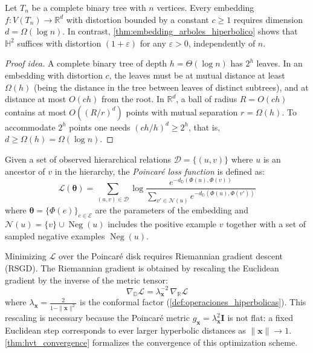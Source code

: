 \begin{proposition}\label{prop:cota_inferior_euclidiano}
Let $T_n$ be a complete binary tree with $n$ vertices. Every embedding $f: V(T_n) \to \mathbb{R}^d$ with distortion bounded by a constant $c \geq 1$ requires dimension $d = \Omega(\log n)$. In contrast, \autoref{thm:embedding_arboles_hiperbolico} shows that $\mathbb{H}^2$ suffices with distortion $(1+\varepsilon)$ for any $\varepsilon > 0$, independently of $n$.
\end{proposition}

\begin{proof}[Proof idea]
A complete binary tree of depth $h = \Theta(\log n)$ has $2^h$ leaves. In an embedding with distortion $c$, the leaves must be at mutual distance at least $\Omega(h)$ (being the distance in the tree between leaves of distinct subtrees), and at distance at most $O(ch)$ from the root. In $\mathbb{R}^d$, a ball of radius $R = O(ch)$ contains at most $O((R/r)^d)$ points with mutual separation $r = \Omega(h)$. To accommodate $2^h$ points one needs $(ch/h)^d \geq 2^h$, that is, $d \geq \Omega(h) = \Omega(\log n)$.
\end{proof}

\begin{definition}\label{def:perdida_poincare}
Given a set of observed hierarchical relations $\mathcal{D} = \{(u, v)\}$ where $u$ is an ancestor of $v$ in the hierarchy, the \textit{Poincaré loss function} \citep{nickel2017poincare} is defined as:
\begin{equation}
    \mathcal{L}(\boldsymbol{\theta}) = \sum_{(u,v) \in \mathcal{D}} \log \frac{e^{-d_{\mathbb{D}}(\Phi(u), \Phi(v))}}{\displaystyle\sum_{v' \in \mathcal{N}(u)} e^{-d_{\mathbb{D}}(\Phi(u), \Phi(v'))}}
    \label{eq:perdida_poincare}
\end{equation}
where $\boldsymbol{\theta} = \{\Phi(e)\}_{e \in \mathcal{E}}$ are the parameters of the embedding and $\mathcal{N}(u) = \{v\} \cup \operatorname{Neg}(u)$ includes the positive example $v$ together with a set of sampled negative examples $\operatorname{Neg}(u)$.
\end{definition}

\begin{remark}\label{rem:optimizacion_riemanniana_poincare}
Minimizing $\mathcal{L}$ over the Poincaré disk requires Riemannian gradient descent (RSGD). The Riemannian gradient is obtained by rescaling the Euclidean gradient by the inverse of the metric tensor:
\begin{equation}
    \nabla_{\mathbb{D}} \mathcal{L} = \lambda_{\mathbf{x}}^{-2}\, \nabla_{\mathbb{R}} \mathcal{L}
\end{equation}
where $\lambda_{\mathbf{x}} = \frac{2}{1 - \|\mathbf{x}\|^2}$ is the conformal factor (\autoref{def:operaciones_hiperbolicas}). This rescaling is necessary because the Poincaré metric $g_{\mathbf{x}} = \lambda_{\mathbf{x}}^2 \mathbf{I}$ is not flat: a fixed Euclidean step corresponds to ever larger hyperbolic distances as $\|\mathbf{x}\| \to 1$. \autoref{thm:hvt_convergence} formalizes the convergence of this optimization scheme.
\end{remark}

